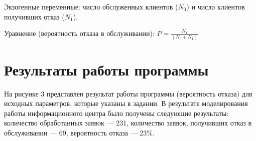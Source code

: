 Экзогенные переменные: число обслуженных клиентов ($N_0$) и число клиентов получивших отказ ($N_1$). 

Уравнение (вероятность отказа в обслуживании): 
$P = \frac{N_1}{(N_0 + N_1)}$

\section*{Результаты работы программы}
На рисунке 3 представлен результат работы программы (вероятность
отказа) для исходных параметров, которые указаны в задании. В результате моделирования работы информационного центра было получены следующие результаты: количество обработанных заявок — 231, количество заявок, получивших отказ в обслуживании — 69, вероятность отказа — 23\%.


